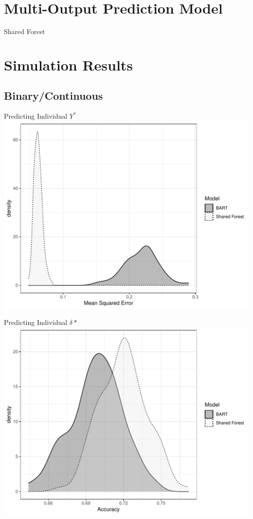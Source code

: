 \documentclass{beamer}
\begin{document}
\section{Multi-Output Prediction Model}

\begin{frame}{Shared Forest}

\end{frame}

\section{Simulation Results} 

\subsection{Binary/Continuous} 

\begin{frame}{Predicting Individual $Y^*$ }
\includegraphics[width = .9\linewidth]{continuous_sim_results_ind_y.pdf}
\end{frame}

\begin{frame}{Predicting Individual $\delta*$}
\includegraphics[width = .9\linewidth]{continuous_sim_results_ind_delta.pdf}
\end{frame}
\end{document}
